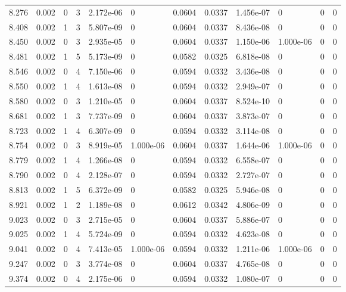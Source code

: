 \documentclass[preview]{standalone}
\begin{document}
{{{\begin{tabular}{L{1.2cm}C{1.2cm} C{0.3cm}C{0.5cm} C{1.4cm}C{1.4cm} C{1.4cm}C{1.4cm} C{1.6cm}C{1.6cm} C{1.6cm}C{1.6cm}}
  8.276  &  0.002  & 0     &  3 &  2.172e-06  & 0  &  0.0604&   0.0337& 1.456e-07 & 0   &  0 & 0  \\ 
  8.408  &  0.002  & 1     &  3 &  5.807e-09  & 0  &  0.0604&   0.0337& 8.436e-08 & 0   &  0 & 0  \\ 
  8.450  &  0.002  & 0     &  3 &  2.935e-05  & 0  &  0.0604&   0.0337& 1.150e-06 & 1.000e-06   &  0 & 0  \\ 
  8.481  &  0.002  & 1     &  5 &  5.173e-09  & 0  &  0.0582&   0.0325& 6.818e-08 & 0   &  0 & 0  \\ 
  8.546  &  0.002  & 0     &  4 &  7.150e-06  & 0  &  0.0594&   0.0332& 3.436e-08 & 0   &  0 & 0  \\ 
  8.550  &  0.002  & 1     &  4 &  1.613e-08  & 0  &  0.0594&   0.0332& 2.949e-07 & 0   &  0 & 0  \\ 
  8.580  &  0.002  & 0     &  3 &  1.210e-05  & 0  &  0.0604&   0.0337& 8.524e-10 & 0   &  0 & 0  \\ 
  8.681  &  0.002  & 1     &  3 &  7.737e-09  & 0  &  0.0604&   0.0337& 3.873e-07 & 0   &  0 & 0  \\ 
  8.723  &  0.002  & 1     &  4 &  6.307e-09  & 0  &  0.0594&   0.0332& 3.114e-08 & 0   &  0 & 0  \\ 
  8.754  &  0.002  & 0     &  3 &  8.919e-05  & 1.000e-06  &  0.0604&   0.0337& 1.644e-06 & 1.000e-06   &  0 & 0  \\ 
  8.779  &  0.002  & 1     &  4 &  1.266e-08  & 0  &  0.0594&   0.0332& 6.558e-07 & 0   &  0 & 0  \\ 
  8.790  &  0.002  & 0     &  4 &  2.128e-07  & 0  &  0.0594&   0.0332& 2.727e-07 & 0   &  0 & 0  \\ 
  8.813  &  0.002  & 1     &  5 &  6.372e-09  & 0  &  0.0582&   0.0325& 5.946e-08 & 0   &  0 & 0  \\ 
  8.921  &  0.002  & 1     &  2 &  1.189e-08  & 0  &  0.0612&   0.0342& 4.806e-09 & 0   &  0 & 0  \\ 
  9.023  &  0.002  & 0     &  3 &  2.715e-05  & 0  &  0.0604&   0.0337& 5.886e-07 & 0   &  0 & 0  \\ 
  9.025  &  0.002  & 1     &  4 &  5.724e-09  & 0  &  0.0594&   0.0332& 4.623e-08 & 0   &  0 & 0  \\ 
  9.041  &  0.002  & 0     &  4 &  7.413e-05  & 1.000e-06  &  0.0594&   0.0332& 1.211e-06 & 1.000e-06   &  0 & 0  \\ 
  9.247  &  0.002  & 0     &  3 &  3.774e-08  & 0  &  0.0604&   0.0337& 4.765e-08 & 0   &  0 & 0  \\ 
  9.374  &  0.002  & 0     &  4 &  2.175e-06  & 0  &  0.0594&   0.0332& 1.080e-07 & 0   &  0 & 0  \\ 

\end{tabular}}}}
\end{document}
